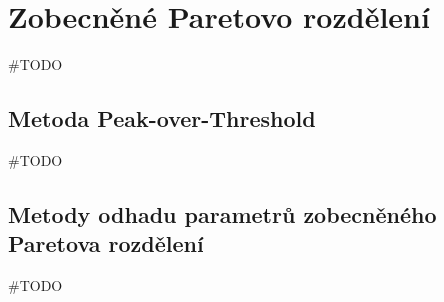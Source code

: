 \chapter{Zobecněné Paretovo rozdělení}\label{chap:gpd}
\#TODO
\section{Metoda Peak-over-Threshold}
\#TODO
\section{Metody odhadu parametrů zobecněného Paretova rozdělení}
\#TODO